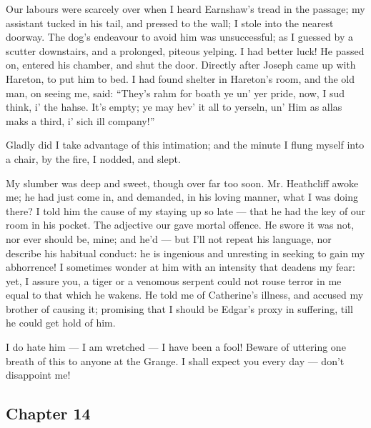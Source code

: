\par Our labours were scarcely over when I heard Earnshaw's tread in the passage; my assistant tucked in his tail, and pressed to the wall; I stole into the nearest doorway. The dog's endeavour to avoid him was unsuccessful; as I guessed by a scutter downstairs, and a prolonged, piteous yelping. I had better luck! He passed on, entered his chamber, and shut the door. Directly after Joseph came up with Hareton, to put him to bed. I had found shelter in Hareton's room, and the old man, on seeing me, said: “They's rahm for boath ye un' yer pride, now, I sud think, i' the hahse. It's empty; ye may hev' it all to yerseln, un' Him as allas maks a third, i' sich ill company!”
\par Gladly did I take advantage of this intimation; and the minute I flung myself into a chair, by the fire, I nodded, and slept.
\par My slumber was deep and sweet, though over far too soon. Mr. Heathcliff awoke me; he had just come in, and demanded, in his loving manner, what I was doing there? I told him the cause of my staying up so late — that he had the key of our room in his pocket. The adjective our gave mortal offence. He swore it was not, nor ever should be, mine; and he'd — but I'll not repeat his language, nor describe his habitual conduct: he is ingenious and unresting in seeking to gain my abhorrence! I sometimes wonder at him with an intensity that deadens my fear: yet, I assure you, a tiger or a venomous serpent could not rouse terror in me equal to that which he wakens. He told me of Catherine's illness, and accused my brother of causing it; promising that I should be Edgar's proxy in suffering, till he could get hold of him.
\par I do hate him — I am wretched — I have been a fool! Beware of uttering one breath of this to anyone at the Grange. I shall expect you every day — don't disappoint me!




\subsection*{Chapter 14}


